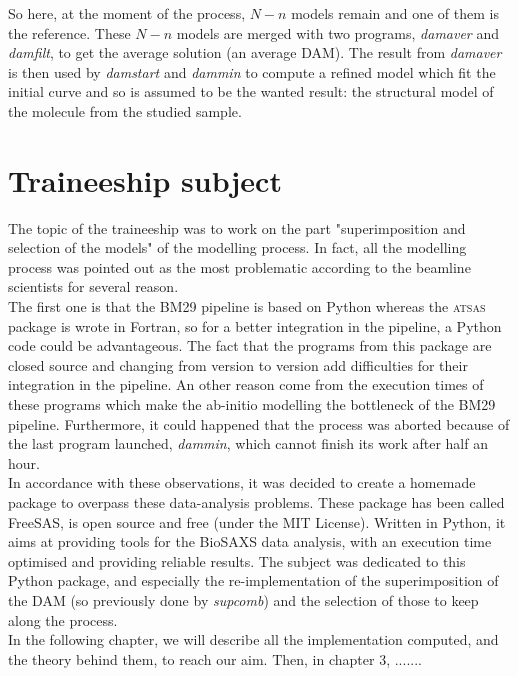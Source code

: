 \documentclass[a4paper, 11pt]{report}
\begin{document}
So here, at the moment of the process, $N - n$ models remain and one 
of them is the reference. 
These $N - n$ models are merged with two programs, \textit{damaver} 
\cite{damaver} and \textit{damfilt}, to get the average solution (an 
average DAM). 
The result from \textit{damaver} is then used by \textit{damstart} and 
\textit{dammin} \cite{dammin} to compute a refined model which fit the 
initial curve and so is assumed to be the wanted result: the 
structural model of the molecule from the studied sample.

\section{Traineeship subject}

The topic of the traineeship was to work on the part "superimposition 
and selection of the models" of the modelling process. 
In fact, all the modelling process was pointed out as the most 
problematic according to the beamline scientists for several reason.\\
The first one is that the BM29 pipeline is based on Python whereas the 
\textsc{atsas} package is wrote in Fortran, so for a better 
integration in the pipeline, a Python code could be advantageous. 
The fact that the programs from this package are closed source and 
changing from version to version add difficulties for their 
integration in the pipeline. 
An other reason come from the execution times of these programs which 
make the ab-initio modelling the bottleneck of the BM29 pipeline. 
Furthermore, it could happened that the process was aborted because of 
the last program launched, \textit{dammin}, which cannot finish its 
work after half an hour.\\

In accordance with these observations, it was decided to create a 
homemade package to overpass these data-analysis problems. 
These package has been called FreeSAS, is open source and free (under 
the MIT License). 
Written in Python, it aims at providing tools for the BioSAXS data 
analysis, with an execution time optimised and providing reliable 
results. 
The subject was dedicated to this Python package, and especially the 
re-implementation of the superimposition of the DAM (so previously 
done by \textit{supcomb}) and the selection of those to keep along the 
process.\\

In the following chapter, we will describe all the implementation 
computed, and the theory behind them, to reach our aim. 
Then, in chapter 3, ....... %
\end{document}
